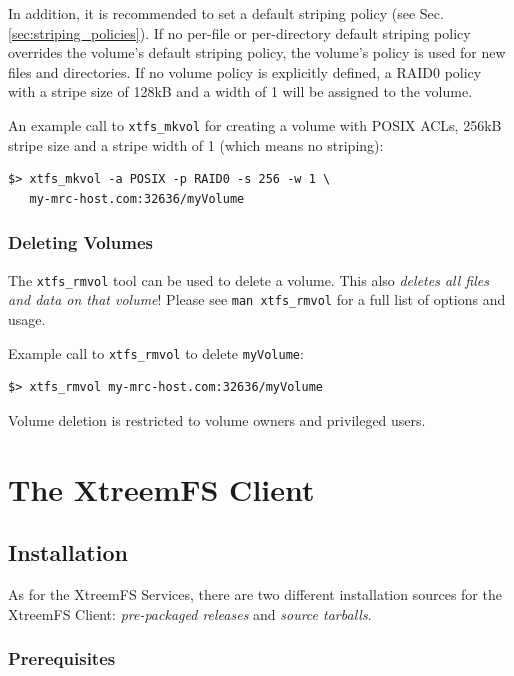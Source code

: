 \documentclass[a4paper,10pt]{book}
\begin{document}
In addition, it is recommended to set a default striping policy (see Sec. \ref{sec:striping_policies}). If no per-file or per-directory default striping policy overrides the volume's default striping policy, the volume's policy is used for new files and directories. If no volume policy is explicitly defined, a RAID0 policy with a stripe size of 128kB and a width of 1 will be assigned to the volume.

An example call to \texttt{xtfs\_mkvol} for creating a volume with POSIX ACLs, 256kB stripe size and a stripe width of 1 (which means no striping):


\begin{verbatim}
$> xtfs_mkvol -a POSIX -p RAID0 -s 256 -w 1 \
   my-mrc-host.com:32636/myVolume
\end{verbatim}

\subsection{Deleting Volumes}

The \texttt{xtfs\_rmvol} tool can be used to delete a volume. This also \emph{deletes all files and data on that volume}! Please see \texttt{man xtfs\_rmvol} for a full list of options and usage.

Example call to \texttt{xtfs\_rmvol} to delete \texttt{myVolume}:


\begin{verbatim}
$> xtfs_rmvol my-mrc-host.com:32636/myVolume
\end{verbatim}

Volume deletion is restricted to volume owners and privileged users.


\chapter{The XtreemFS Client}

\section{Installation}

As for the XtreemFS Services, there are two different installation sources for the XtreemFS Client: \emph{pre-packaged releases} and \emph{source tarballs}.

\subsection{Prerequisites}
\end{document}
